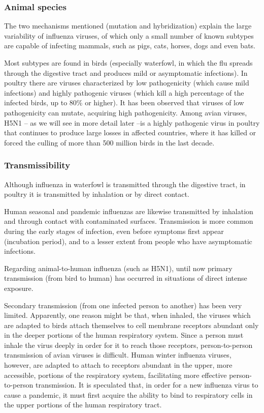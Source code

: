 \documentclass[12pt, a4]{scrartcl}
\begin{document}
\subsubsection{Animal species}
The two mechanisms mentioned (mutation and hybridization) explain the large variability of influenza viruses, of which only a small number of known subtypes are capable of infecting mammals, such as pigs, cats, horses, dogs and even bats.

Most subtypes are found in birds (especially waterfowl, in which the flu spreads through the digestive tract and produces mild or asymptomatic infections). In poultry there are viruses characterized by low pathogenicity (which cause mild infections) and highly pathogenic viruses (which kill a high percentage of the infected birds, up to 80\% or higher). It has been observed that viruses of low pathogenicity can mutate, acquiring high pathogenicity. Among avian viruses, H5N1 – as we will see in more detail later –is a highly pathogenic virus in poultry that continues to produce large losses in affected countries, where it has killed or forced the culling of more than 500 million birds in the last decade.

\subsubsection{Transmissibility}
Although influenza in waterfowl is transmitted through the digestive tract, in poultry it is transmitted by inhalation or by direct contact. 

Human seasonal and pandemic influenzas are likewise transmitted by inhalation and through contact with contaminated surfaces. Transmission is more common during the early stages of infection, even before symptoms first appear (incubation period), and to a lesser extent from people who have asymptomatic infections.

Regarding animal-to-human influenza (such as H5N1), until now primary transmission (from bird to human) has occurred in situations of direct intense exposure.

Secondary transmission (from one infected person to another) has been very limited. Apparently, one reason might be that, when inhaled, the viruses which are adapted to birds attach themselves to cell membrane receptors abundant only in the deeper portions of the human respiratory system. Since a person must inhale the virus deeply in order for it to reach those receptors, person-to-person transmission of avian viruses is difficult. Human winter influenza viruses, however, are adapted to attach to receptors abundant in the upper, more accessible, portions of the respiratory system, facilitating more effective person-to-person transmission. It is speculated that, in order for a new influenza virus to cause a pandemic, it must first acquire the ability to bind to respiratory cells in the upper portions of the human respiratory tract.
\end{document}
